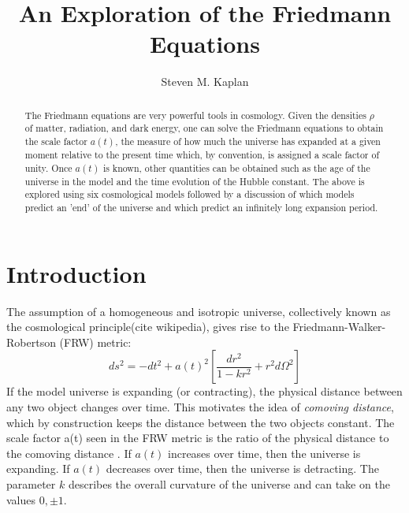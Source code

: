 \documentclass[aps,reprint,prl,floatfix]{revtex4-1}
\begin{document}
\title{An Exploration of the Friedmann Equations}
\author{Steven M. Kaplan}

\begin{abstract}
The Friedmann equations are very powerful tools in cosmology.  Given the densities $\rho$ of matter, radiation, and dark energy, one can solve the Friedmann equations to obtain the scale factor $a(t)$, the measure of how much the universe has expanded at a given moment relative to the present time which, by convention, is assigned a scale factor of unity.  Once $a(t)$ is known, other quantities can be obtained such as the age of the universe in the model and the time evolution of the Hubble constant.  The above is explored using six cosmological models followed by a discussion of which models predict an 'end' of the universe and which predict an infinitely long expansion period.
\end{abstract}

\maketitle

\section*{Introduction}
The assumption of a homogeneous and isotropic universe, collectively known as the cosmological principle(cite wikipedia), gives rise to the Friedmann-Walker-Robertson (FRW) metric:
$$ds^2=-dt^2 + a(t)^2\left[ \frac{dr^2}{1-kr^2} + r^2d\Omega^2 \right]$$
If the model universe is expanding (or contracting), the physical distance between any two object changes over time.  This motivates the idea of \emph{comoving distance}, which by construction keeps the distance between the two objects constant.  The scale factor a(t) seen in the FRW metric is the ratio of the physical distance to the comoving distance \cite{wiki_scalefactor}.  If $a(t)$ increases over time, then the universe is expanding.  If $a(t)$ decreases over time, then the universe is detracting.  The parameter $k$ describes the overall curvature of the universe and can take on the values $0,\pm1$.
\end{document}
